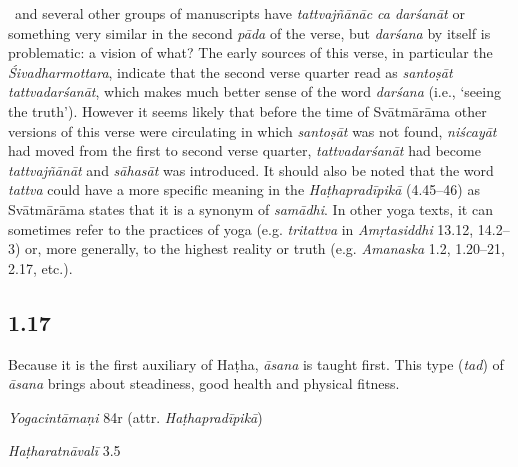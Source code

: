 \begin{ekdosis}
\begin{testimonia}[hp01_016]
\end{testimonia}

\begin{philcomm}[hp01_016]    
\textalpha\ and several other groups of manuscripts have \emph{tattvajñānāc ca darśanāt} or something very similar in the second \emph{pāda} of the verse, but \emph{darśana} by itself is problematic: a vision of what? The early sources of this verse, in particular the \emph{Śivadharmottara}, indicate that the second verse quarter read as \emph{santoṣāt tattvadarśanāt}, which makes much better sense of the word \emph{darśana} (i.e., ‘seeing the truth’). However it seems likely that before the time of Svātmārāma other versions of this verse were circulating in which \emph{santoṣāt} was not found, \emph{niścayāt} had moved from the first to second verse quarter, \emph{tattvadarśanāt} had become \emph{tattvajñānāt} and \emph{sāhasāt} was introduced. It should also be noted that the word \emph{tattva} could have a more specific meaning in the \emph{Haṭhapradīpikā} (4.45–46) as Svātmārāma states that it is a synonym of \emph{samādhi}. In other yoga texts, it can sometimes refer to the practices of yoga (e.g. \emph{tritattva} in \emph{Amṛtasiddhi} 13.12, 14.2--3) or, more generally, to the highest reality or truth (e.g. \emph{Amanaska} 1.2, 1.20–21, 2.17, etc.).  
\end{philcomm}

\subsection*{1.17}
\begin{translation}[hp01_017]
Because it is the first auxiliary of Haṭha, \emph{āsana} is taught first. This type (\emph{tad}) of \emph{āsana} brings about steadiness, good health and physical fitness.
\end{translation}

\begin{testimonia}[hp01_017]
\emph{Yogacintāmaṇi} 84r (attr. \emph{Haṭhapradīpikā})

\begin{versinnote}
\end{versinnote}

\emph{Haṭharatnāvalī} 3.5

\begin{versinnote}
\end{versinnote}


\end{testimonia}
\end{ekdosis}
